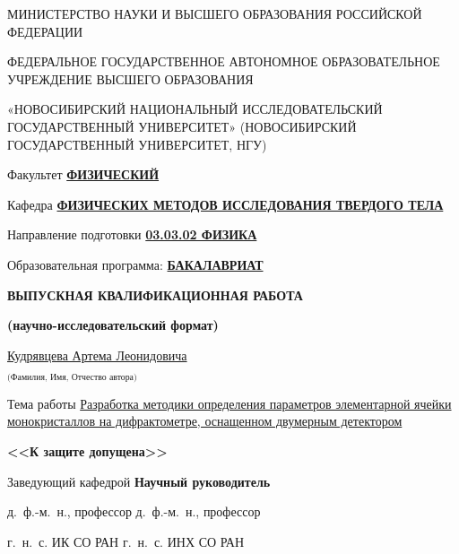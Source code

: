 \begin{titlepage}
\thispagestyle{empty}
\begin{spacing}{1.15}
\footnotesize
\begin{center}
    МИНИСТЕРСТВО НАУКИ И ВЫСШЕГО ОБРАЗОВАНИЯ РОССИЙСКОЙ ФЕДЕРАЦИИ
    \vspace{20pt}

    ФЕДЕРАЛЬНОЕ ГОСУДАРСТВЕННОЕ АВТОНОМНОЕ ОБРАЗОВАТЕЛЬНОЕ\\
    УЧРЕЖДЕНИЕ ВЫСШЕГО ОБРАЗОВАНИЯ
    \vspace{6pt}

    «НОВОСИБИРСКИЙ НАЦИОНАЛЬНЫЙ ИССЛЕДОВАТЕЛЬСКИЙ ГОСУДАРСТВЕННЫЙ УНИВЕРСИТЕТ» (НОВОСИБИРСКИЙ ГОСУДАРСТВЕННЫЙ УНИВЕРСИТЕТ, НГУ)
    \vspace{10pt}
\end{center}
Факультет \uline{\textbf{ФИЗИЧЕСКИЙ}}
\vspace{10pt}

\noindent
Кафедра \uline{\textbf{ФИЗИЧЕСКИХ МЕТОДОВ ИССЛЕДОВАНИЯ ТВЕРДОГО ТЕЛА}}
\vspace{8mm}

\noindent
Направление подготовки \uline{\textbf{03.03.02 ФИЗИКА}}
\vspace{10pt}

\noindent
Образовательная программа: \uline{\textbf{БАКАЛАВРИАТ}}
\vspace{8mm}
\begin{center}
    \textbf{ВЫПУСКНАЯ КВАЛИФИКАЦИОННАЯ РАБОТА}

    \textbf{(научно-исследовательский формат)}
    \vspace{8mm}

    \uline{\hfill Кудрявцева Артема Леонидовича \hfill}

    $_\text{(Фамилия, Имя, Отчество автора)}$
    \vspace{8mm}
\end{center}
Тема работы \uline{Разработка методики определения параметров элементарной ячейки монокристаллов на дифрактометре, оснащенном двумерным детектором\hfill}
\vfill

\noindent
\textbf{<<К защите допущена>>}

\noindent
Заведующий кафедрой \hfill \textbf{Научный руководитель}
\vspace{10pt}

\noindent
д.~ф.-м.~н., профессор \hfill д.~ф.-м.~н., профессор
\vspace{10pt}

\noindent
г.~н.~с. ИК СО РАН \hfill г.~н.~с. ИНХ СО РАН
\vspace{10pt}


\end{spacing}
\end{titlepage}
